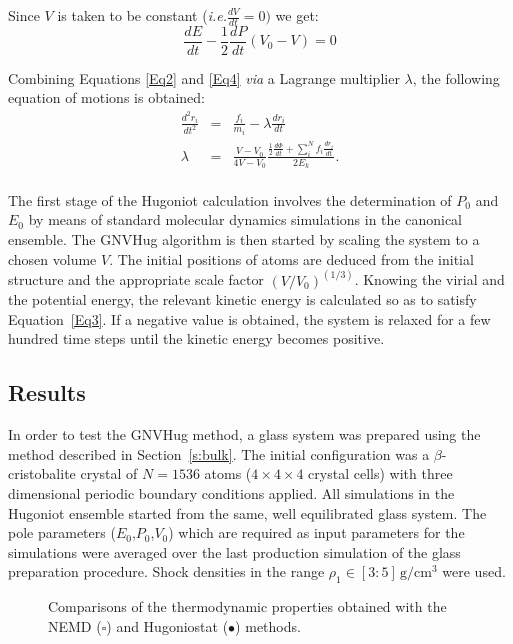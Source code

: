 \documentclass[aps,10pt,twocolumn]{revtex4}
\makeatletter
\newcommand{\ie}{\emph{i.e.}\@\xspace}
\newcommand{\mrm}[1]{\ensuremath{\mathrm{#1}}\xspace}
\newlength{\picW}	%
\newcommand{\picA}{270}	%
\newcommand{\picL}[1]{\texttt{[image: \#1]}}
\makeatother
\begin{document}
Since $V$ is taken to be constant (\ie $\frac{dV}{dt}=0)$ we get:
\begin{equation}
\frac{dE}{dt}-\frac{1}{2}\frac{dP}{dt}\left( V_{0}-V\right) =0  \label{Eq4}
\end{equation}

Combining Equations \ref{Eq2} and \ref{Eq4} \textit{via} a Lagrange multiplier $\lambda $, the
following equation of motions is obtained:
\begin{eqnarray}
\frac{d^2r_i}{dt^2}&=&\frac{f_i}{m_i}-\lambda\frac{dr_i}{dt}\label{Eq5}\\
\lambda&=&\frac{V-V_0}{4V-V_0}\frac{\frac{1}{2}\frac{d\Phi}{dt}+\sum_i^Nf_{i}\frac{dr_i}{dt}}{2E_k}.\label{Eq6}
\end{eqnarray}\\


The first stage of the Hugoniot calculation involves the determination of $P_{0}$ and $E_{0}$ by
means of standard molecular dynamics simulations in the canonical ensemble.  
The GNVHug algorithm is then started by scaling the system to a chosen volume $V$. The
initial positions of atoms  are deduced from the initial structure and the appropriate scale factor
$\left(V/V_0\right)^{(1/3)}$. Knowing the virial and the potential energy, the relevant
kinetic energy is calculated so as to satisfy Equation~\ref{Eq3}. 
If a negative value is obtained, the system is relaxed for a few hundred time steps until the
kinetic energy becomes positive.



\subsection{Results}


In order to test the GNVHug method, a glass system was prepared using the method described
in Section~\ref{s:bulk}. The initial configuration was a $\beta$-cristobalite crystal of
$N=1536$ atoms ($4\times4\times4$ crystal cells) with three dimensional periodic boundary
conditions applied. All simulations in the Hugoniot ensemble started from the same, well
equilibrated glass system. The pole parameters ($E_0$,$P_0$,$V_0$) which are required as input
parameters for the simulations were averaged over the last production simulation of the glass
preparation procedure. Shock densities in the range $\rho_1\in[3:5]\, \mrm{ g/cm^{3}}$ were used.\\ 

\picW=8cm
\begin{figure}
\subfigure[]{\picL{fig08a.ps}}
\subfigure[]{\picL{fig08b.ps}}
\caption{Comparisons of the thermodynamic properties obtained with the NEMD ($\square$) and
Hugoniostat ($\bullet$) methods. }
\label{fig:cmp_thedy}
\end{figure}
\end{document}
